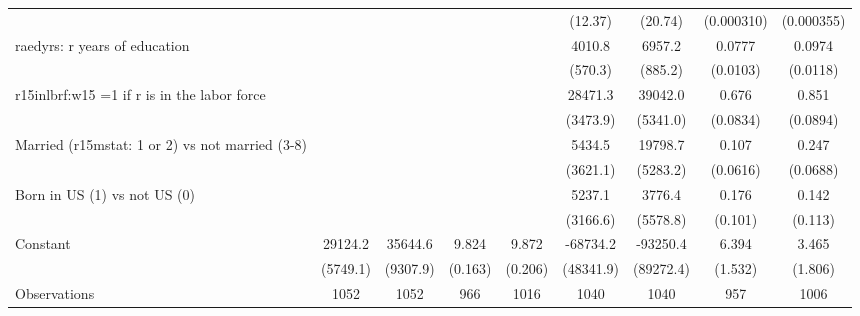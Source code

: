 \begin{table}[htbp]
\begin{tabular}{l*{8}{c}}
                &                  &                  &                  &                  &  (12.37)         &  (20.74)         &(0.000310)         &(0.000355)         \\
\addlinespace
raedyrs: r years of education&                  &                  &                  &                  &   4010.8\sym{***}&   6957.2\sym{***}&   0.0777\sym{***}&   0.0974\sym{***}\\
                &                  &                  &                  &                  &  (570.3)         &  (885.2)         & (0.0103)         & (0.0118)         \\
\addlinespace
r15inlbrf:w15 =1 if r is in the labor force&                  &                  &                  &                  &  28471.3\sym{***}&  39042.0\sym{***}&    0.676\sym{***}&    0.851\sym{***}\\
                &                  &                  &                  &                  & (3473.9)         & (5341.0)         & (0.0834)         & (0.0894)         \\
\addlinespace
Married (r15mstat: 1 or 2) vs not married (3-8)&                  &                  &                  &                  &   5434.5         &  19798.7\sym{***}&    0.107\sym{*}  &    0.247\sym{***}\\
                &                  &                  &                  &                  & (3621.1)         & (5283.2)         & (0.0616)         & (0.0688)         \\
\addlinespace
Born in US (1) vs not US (0)&                  &                  &                  &                  &   5237.1\sym{*}  &   3776.4         &    0.176\sym{*}  &    0.142         \\
                &                  &                  &                  &                  & (3166.6)         & (5578.8)         &  (0.101)         &  (0.113)         \\
\addlinespace
Constant        &  29124.2\sym{***}&  35644.6\sym{***}&    9.824\sym{***}&    9.872\sym{***}& -68734.2         & -93250.4         &    6.394\sym{***}&    3.465\sym{*}  \\
                & (5749.1)         & (9307.9)         &  (0.163)         &  (0.206)         &(48341.9)         &(89272.4)         &  (1.532)         &  (1.806)         \\
\midrule
Observations    &     1052         &     1052         &      966         &     1016         &     1040         &     1040         &      957         &     1006         \\

\end{tabular}
\end{table}

